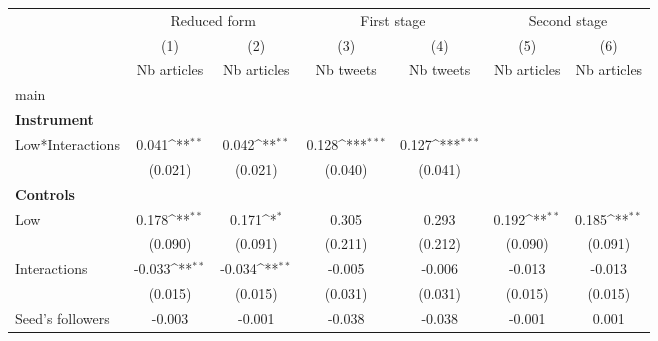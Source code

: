 {
\def\sym#1{\ifmmode^{#1}\else\(^{#1}\)\fi}
\begin{tabular}{l*{6}{c}}
\hline\hline
                    &\multicolumn{2}{c}{Reduced form}           &\multicolumn{2}{c}{First stage}            &\multicolumn{2}{c}{Second stage}           \\\cmidrule(lr){2-3}\cmidrule(lr){4-5}\cmidrule(lr){6-7}
                    &\multicolumn{1}{c}{(1)}&\multicolumn{1}{c}{(2)}&\multicolumn{1}{c}{(3)}&\multicolumn{1}{c}{(4)}&\multicolumn{1}{c}{(5)}&\multicolumn{1}{c}{(6)}\\
                    &\multicolumn{1}{c}{Nb articles}&\multicolumn{1}{c}{Nb articles}&\multicolumn{1}{c}{Nb tweets}&\multicolumn{1}{c}{Nb tweets}&\multicolumn{1}{c}{Nb articles}&\multicolumn{1}{c}{Nb articles}\\
\hline
main                &                     &                     &                     &                     &                     &                     \\
\textbf{Instrument} &                     &                     &                     &                     &                     &                     \\
Low*Interactions    &       0.041\sym{**} &       0.042\sym{**} &       0.128\sym{***}&       0.127\sym{***}&                     &                     \\
                    &     (0.021)         &     (0.021)         &     (0.040)         &     (0.041)         &                     &                     \\
\textbf{Controls}   &                     &                     &                     &                     &                     &                     \\
Low                 &       0.178\sym{**} &       0.171\sym{*}  &       0.305         &       0.293         &       0.192\sym{**} &       0.185\sym{**} \\
                    &     (0.090)         &     (0.091)         &     (0.211)         &     (0.212)         &     (0.090)         &     (0.091)         \\
Interactions        &      -0.033\sym{**} &      -0.034\sym{**} &      -0.005         &      -0.006         &      -0.013         &      -0.013         \\
                    &     (0.015)         &     (0.015)         &     (0.031)         &     (0.031)         &     (0.015)         &     (0.015)         \\
Seed’s followers    &      -0.003         &      -0.001         &      -0.038         &      -0.038         &      -0.001         &       0.001         \\

\end{tabular}}
